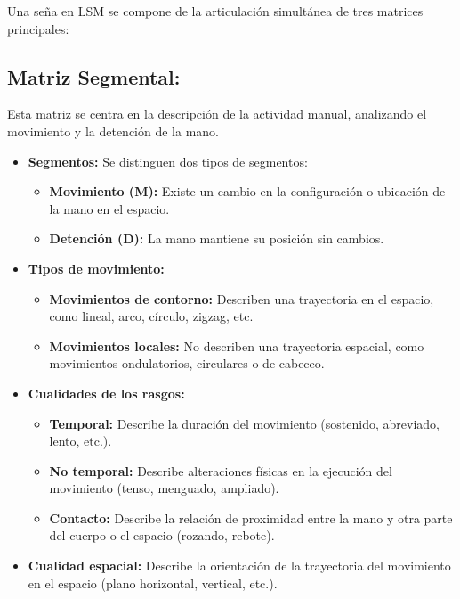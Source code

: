 Una seña en LSM se compone de la articulación simultánea de tres matrices principales:

\subsection{Matriz Segmental:}

Esta matriz se centra en la descripción de la actividad manual,  analizando el movimiento y la detención de la mano.

\begin{itemize}
    \item \textbf{Segmentos:} Se distinguen dos tipos de segmentos:
    \begin{itemize}
        \item \textbf{Movimiento (M):}  Existe un cambio en la configuración o ubicación de la mano en el espacio.
        \item \textbf{Detención (D):} La mano mantiene su posición sin cambios.
    \end{itemize}

    \item \textbf{Tipos de movimiento:}
    \begin{itemize}
        \item \textbf{Movimientos de contorno:}  Describen una trayectoria en el espacio, como lineal, arco, círculo, zigzag, etc.
        \item \textbf{Movimientos locales:} No describen una trayectoria espacial, como movimientos ondulatorios, circulares o de cabeceo.
    \end{itemize}

    \item \textbf{Cualidades de los rasgos:}
    \begin{itemize}
        \item \textbf{Temporal:} Describe la duración del movimiento (sostenido, abreviado, lento, etc.).
        \item \textbf{No temporal:} Describe alteraciones físicas en la ejecución del movimiento (tenso, menguado, ampliado).
        \item \textbf{Contacto:} Describe la relación de proximidad entre la mano y otra parte del cuerpo o el espacio (rozando, rebote).
    \end{itemize}

    \item \textbf{Cualidad espacial:} Describe la orientación de la trayectoria del movimiento en el espacio (plano horizontal, vertical, etc.).
\end{itemize}


